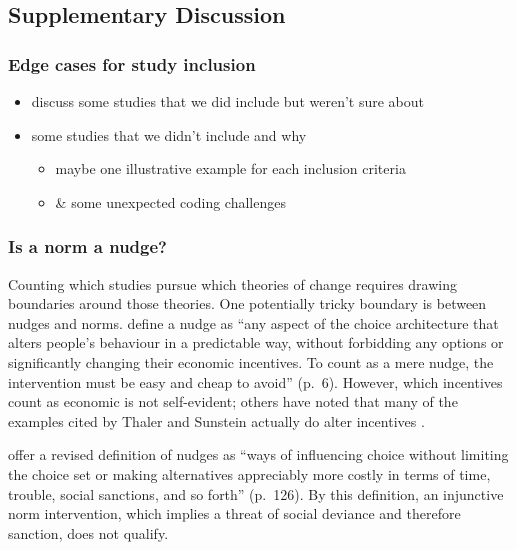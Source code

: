 \documentclass[sn-nature,pdflatex]{sn-jnl}
\begin{document}
\subsection{Supplementary Discussion}\label{supplementary-discussion}

\subsubsection{Edge cases for study
inclusion}\label{edge-cases-for-study-inclusion}

\begin{itemize}
\item
  discuss some studies that we did include but weren't sure about
\item
  some studies that we didn't include and why

  \begin{itemize}
  \item
    maybe one illustrative example for each inclusion criteria
  \item
    \& some unexpected coding challenges
  \end{itemize}
\end{itemize}

\subsubsection{Is a norm a nudge?}\label{is-a-norm-a-nudge}

Counting which studies pursue which theories of change requires drawing
boundaries around those theories. One potentially tricky boundary is
between nudges and norms. \citep{thaler2009} define a nudge as ``any
aspect of the choice architecture that alters people's behaviour in a
predictable way, without forbidding any options or significantly
changing their economic incentives. To count as a mere nudge, the
intervention must be easy and cheap to avoid'' (p.~6). However, which
incentives count as economic is not self-evident; others have noted that
many of the examples cited by Thaler and Sunstein actually do alter
incentives \citep{selinger2012}.

\citep{hausman2010} offer a revised definition of nudges as ``ways of
influencing choice without limiting the choice set or making
alternatives appreciably more costly in terms of time, trouble, social
sanctions, and so forth'' (p.~126). By this definition, an injunctive
norm intervention, which implies a threat of social deviance and
therefore sanction, does not qualify.
\end{document}
